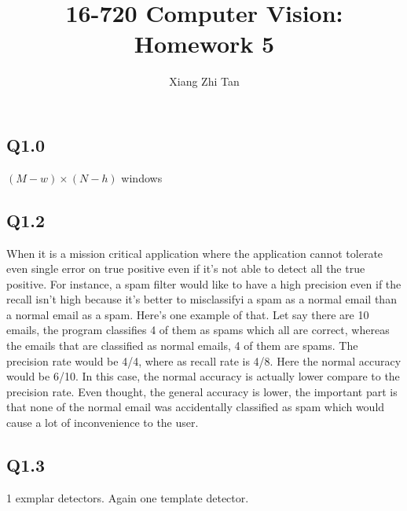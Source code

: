 \documentclass{article}
\begin{document}
\title{16-720 Computer Vision: Homework 5}
\author{Xiang Zhi Tan}

\maketitle
\subsection*{Q1.0}
$(M - w) \times (N - h)$ windows

\subsection*{Q1.2}
When it is a mission critical application where the application cannot tolerate even single error on true positive even if it's not able to detect all the true positive. For instance, a spam filter would like to have a high precision even if the recall isn't high because it's better to misclassifyi a spam as a normal email than a normal email as a spam. Here's one example of that. Let say there are 10 emails, the program classifies 4 of them as spams which all are correct, whereas the emails that are classified as normal emails, 4 of them are spams. The precision rate would be 4/4, where as recall rate is 4/8. Here the normal accuracy would be 6/10. In this case, the normal accuracy is actually lower compare to the precision rate. Even thought, the general accuracy is lower, the important part is that none of the normal email was accidentally classified as spam which would cause a lot of inconvenience to the user.

\subsection*{Q1.3}
1 exmplar detectors. Again one template detector.
\end{document}
